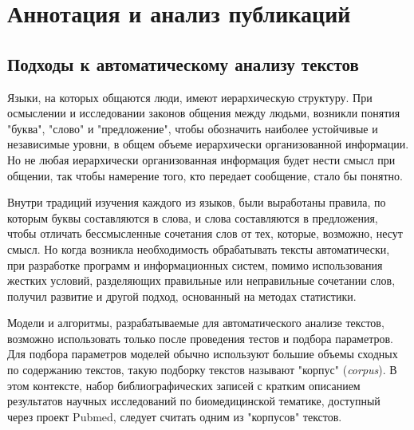 \section{Аннотация и анализ публикаций}

\subsection{Подходы к автоматическому анализу текстов} \label{sect_computationallinguistics}

Языки, на которых общаются люди, имеют иерархическую структуру. При осмыслении и исследовании законов общения между людьми, возникли понятия "буква", "слово" и "предложение", чтобы обозначить наиболее устойчивые и независимые уровни, в общем объеме иерархически организованной информации. Но не любая иерархически организованная информация будет нести смысл при общении, так чтобы намерение того, кто передает сообщение, стало бы понятно.

Внутри традиций изучения каждого из языков, были выработаны правила, по которым буквы составляются в слова, и слова составляются в предложения, чтобы отличать бессмысленные сочетания слов от тех, которые, возможно, несут смысл. Но когда возникла необходимость обрабатывать тексты автоматически, при разработке программ и информационных систем, помимо использования жестких условий, разделяющих правильные или неправильные сочетании слов, получил развитие и другой подход, основанный на методах статистики.

Модели и алгоритмы, разрабатываемые для автоматического анализе текстов, возможно использовать только после проведения тестов и подбора параметров. Для подбора параметров моделей обычно используют большие объемы сходных по содержанию текстов, такую подборку текстов называют "корпус" (\textit{corpus}). В этом контексте, набор библиографических записей с кратким описанием результатов научных исследований по биомедицинской тематике, доступный через проект Pubmed, следует считать одним из "корпусов" текстов.

